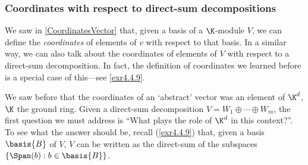 \subsubsection{Coordinates with respect to direct-sum decompositions}

We saw in \cref{CoordinatesVector} that, given a basis of a $\K$-module $V$, we can define the \emph{coordinates} of elements of $v$ with respect to that basis.  In a similar way, we can also talk about the coordinates of elements of $V$ with respect to a direct-sum decomposition.   In fact, the definition of coordinates we learned before is a special case of this---see \cref{exr4.4.9}.

We saw before that the coordinates of an `abstract' vector was an element of $\K ^d$, $\K$ the ground ring.  Given a direct-sum decomposition $V=W_1\oplus \cdots \oplus W_m$, the first question we must address is ``What plays the role of $\K ^d$ in this context?''.  To see what the answer should be, recall (\cref{exr4.4.9}) that, given a basis $\basis{B}$ of $V$, $V$ can be written as the direct-sum of the subspaces $\{ \Span (b):b\in \basis{B}\}$.

